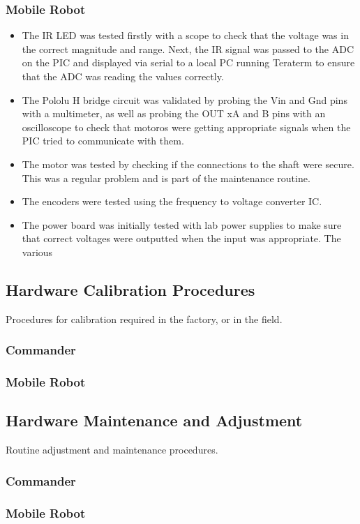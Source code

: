\documentclass[11pt,a4paper]{article}
\begin{document}
    \subsubsection{Mobile Robot}
      \begin{itemize}
        \item The IR LED was tested firstly with a scope to check that the voltage was in the correct magnitude and range. Next, the IR signal was passed to the ADC on the PIC and displayed via serial to a local PC running Teraterm to ensure that the ADC was reading the values correctly.
        \item The Pololu H bridge circuit was validated by probing the Vin and Gnd pins with a multimeter, as well as probing the OUT xA and B pins with an oscilloscope to check that motoros were getting appropriate signals when the PIC tried to communicate with them.
        \item The motor was tested by checking if the connections to the shaft were secure. This was a regular problem and is part of the maintenance routine.
        \item The encoders were tested using the frequency to voltage converter IC.
        \item The power board was initially tested with lab power supplies to make sure that correct voltages were outputted when the input was appropriate. The various

      \end{itemize}

  \subsection{Hardware Calibration Procedures}
    Procedures for calibration required in the factory, or in the field.
    \subsubsection{Commander}
    \subsubsection{Mobile Robot}

  \subsection{Hardware Maintenance and Adjustment}
    Routine adjustment and maintenance procedures.
    \subsubsection{Commander}
    \subsubsection{Mobile Robot}
\end{document}
